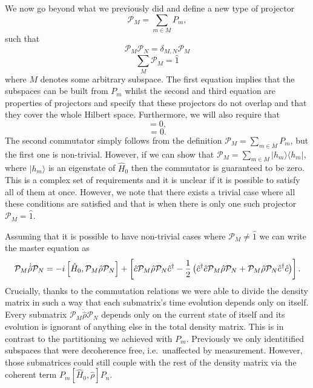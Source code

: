 We now go beyond what we previously did and define a new type of
projector 
\begin{equation}
  \mathcal{P}_M = \sum_{m \in M} P_m,
\end{equation}
such that 
\begin{equation}
  \mathcal{P}_M \mathcal{P}_N = \delta_{M,N} \mathcal{P}_M
\end{equation}
\begin{equation}
  \sum_M \mathcal{P}_M = \hat{1}
\end{equation}
where $M$ denotes some arbitrary subspace. The first equation implies that
the subspaces can be built from
$P_m$ whilst the second and third equation are properties of
projectors and specify that these projectors do not overlap and that
they cover the whole Hilbert space. Furthermore, we will also require
that 
\begin{equation}
  [\mathcal{P}_M, \hat{H}_0 ] = 0,
\end{equation}
\begin{equation}
  [\mathcal{P}_M, \c] = 0. 
\end{equation}
The second commutator simply follows from the definition
$\mathcal{P}_M = \sum_{m \in M} P_m$, but the first one is
non-trivial. However, if we can show that
$\mathcal{P}_M = \sum_{m \in M} | h_m \rangle \langle h_m |$, where
$| h_m \rangle$ is an eigenstate of $\hat{H}_0$ then the commutator is
guaranteed to be zero. This is a complex set of requirements and it is
unclear if it is possible to satisfy all of them at once. However, we
note that there exists a trivial case where all these conditions are
satisfied and that is when there is only one such projector
$\mathcal{P}_M = \hat{1}$.

Assuming that it is possible to have non-trivial cases where
$\mathcal{P}_M \ne \hat{1}$ we can write the master equation as
\begin{equation} 
  \label{eq:bigP}
  \mathcal{P}_M \dot{\hat{\rho}} \mathcal{P}_N = -i
  \left[\hat{H}_0, \mathcal{P}_M \hat{\rho} \mathcal{P}_N \right] +
  \left[ \hat{c} \mathcal{P}_M \hat{\rho}
  \mathcal{P}_N \hat{c}^\dagger - \frac{1}{2} \left( \hat{c}^\dagger \hat{c} \mathcal{P}_M \hat{\rho}
  \mathcal{P}_N + \mathcal{P}_M \hat{\rho} \mathcal{P}_N \hat{c}^\dagger \hat{c} \right)
  \right].
\end{equation} 
Crucially, thanks to the commutation relations we were able to divide
the density matrix in such a way that each submatrix's time evolution
depends only on itself. Every submatrix
$\mathcal{P}_M \dot{\hat{\rho}} \mathcal{P}_N$ depends only on the
current state of itself and its evolution is ignorant of anything else
in the total density matrix. This is in contrast to the partitioning
we achieved with $P_m$. Previously we only identitified subspaces that
were decoherence free, i.e.~unaffected by measurement. However, those
submatrices could still couple with the rest of the density matrix via
the coherent term $P_m [\hat{H}_0, \hat{\rho}] P_n$.

